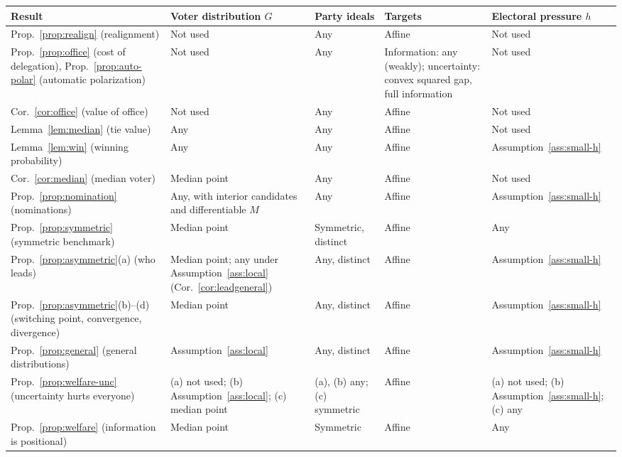 \documentclass[12pt,letterpaper]{article}
\renewcommand{\arraystretch}{0.75}
\begin{document}
\begin{table}[p]
\begin{spacing}{1}
\centering
\footnotesize
\renewcommand{\arraystretch}{1.1}
\begin{tabular}{@{}L{4.0cm}L{2.8cm}L{2.0cm}L{3.0cm}L{2.4cm}@{}}
\toprule
Result & Voter distribution $G$ & Party ideals & Targets & Electoral pressure $h$ \\
\midrule
Prop.~\ref{prop:realign} (realignment) & Not used & Any & Affine & Not used \\
Prop.~\ref{prop:office} (cost of delegation), Prop.~\ref{prop:auto-polar} (automatic polarization) & Not used & Any & Information: any (weakly); uncertainty: convex squared gap, full information & Not used \\
Cor.~\ref{cor:office} (value of office) & Not used & Any & Affine & Not used \\
Lemma~\ref{lem:median} (tie value) & Any & Any & Affine & Not used \\
Lemma~\ref{lem:win} (winning probability) & Any & Any & Affine & Assumption~\ref{ass:small-h} \\
Cor.~\ref{cor:median} (median voter) & Median point & Any & Affine & Not used \\
Prop.~\ref{prop:nomination} (nominations) & Any, with interior candidates and differentiable $M$ & Any & Affine & Assumption~\ref{ass:small-h} \\
Prop.~\ref{prop:symmetric} (symmetric benchmark) & Median point & Symmetric, distinct & Affine & Any \\
Prop.~\ref{prop:asymmetric}(a) (who leads) & Median point; any under Assumption~\ref{ass:local} (Cor.~\ref{cor:leadgeneral}) & Any, distinct & Affine & Assumption~\ref{ass:small-h} \\
Prop.~\ref{prop:asymmetric}(b)--(d) (switching point, convergence, divergence) & Median point & Any, distinct & Affine & Assumption~\ref{ass:small-h} \\
Prop.~\ref{prop:general} (general distributions) & Assumption~\ref{ass:local} & Any, distinct & Affine & Assumption~\ref{ass:small-h} \\
Prop.~\ref{prop:welfare-unc} (uncertainty hurts everyone) & (a) not used; (b) Assumption~\ref{ass:local}; (c) median point & (a), (b) any; (c) symmetric & Affine & (a) not used; (b) Assumption~\ref{ass:small-h}; (c) any \\
Prop.~\ref{prop:welfare} (information is positional) & Median point & Symmetric & Affine & Any \\

\end{tabular}
\end{spacing}
\end{table}
\end{document}
